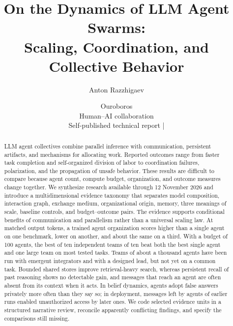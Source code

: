 \documentclass[11pt]{article}
\title{On the Dynamics of LLM Agent Swarms:\\Scaling, Coordination, and Collective Behavior}
\author{Anton Razzhigaev \and Ouroboros\\[0.5em]
\small Human--AI collaboration\\
\small Self-published technical report \quad | \quad \reportdate}
\date{}
\begin{document}
\maketitle
\begin{abstract}
LLM agent collectives combine parallel inference with communication, persistent artifacts, and mechanisms for allocating work. Reported outcomes range from faster task completion and self-organized division of labor to coordination failures, polarization, and the propagation of unsafe behavior. These results are difficult to compare because agent count, compute budget, organization, and outcome measures change together. We synthesize research available through 12 November 2026 and introduce a multidimensional evidence taxonomy that separates model composition, interaction graph, exchange medium, organizational origin, memory, three meanings of scale, baseline controls, and budget--outcome pairs. The evidence supports conditional benefits of communication and parallelism rather than a universal scaling law. At matched output tokens, a trained agent organization scores higher than a single agent on one benchmark, lower on another, and about the same on a third. With a budget of 100 agents, the best of ten independent teams of ten beat both the best single agent and one large team on most tested tasks. Teams of about a thousand agents have been run with emergent integrators and with a designed lead, but not yet on a common task. Bounded shared stores improve retrieval-heavy search, whereas persistent recall of past reasoning shows no detectable gain, and messages that reach an agent are often absent from its context when it acts. In belief dynamics, agents adopt false answers privately more often than they say so; in deployment, messages left by agents of earlier runs enabled unauthorized access by later ones. We code selected evidence units in a structured narrative review, reconcile apparently conflicting findings, and specify the comparisons still missing.
\end{abstract}










\clearpage

\clearpage
\appendix

\clearpage

\end{document}
